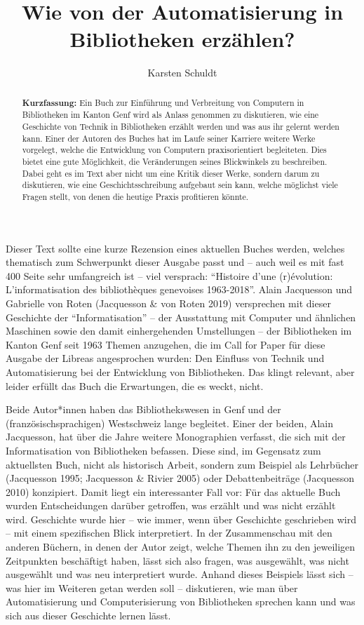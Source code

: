 \documentclass[a4paper,
fontsize=11pt,
oneside,
numbers=noperiodatend,
parskip=half-,
bibliography=totoc,
final
]{scrartcl}
\title{\LARGE{Wie von der Automatisierung in Bibliotheken erzählen?}}%
\author{Karsten Schuldt} %
\date{}
\begin{document}
\maketitle
\thispagestyle{fancyplain} 

\begin{abstract}
\noindent
\textbf{Kurzfassung:} Ein Buch zur Einführung und Verbreitung von Computern in Bibliotheken im Kanton Genf wird als Anlass genommen zu diskutieren, wie eine Geschichte von Technik in Bibliotheken erzählt werden und was aus ihr gelernt werden kann. Einer der Autoren des Buches hat im Laufe seiner Karriere weitere Werke vorgelegt, welche die Entwicklung von Computern praxisorientiert begleiteten. Dies bietet eine gute Möglichkeit, die Veränderungen seines Blickwinkels zu beschreiben. Dabei geht es im Text aber nicht um eine Kritik dieser Werke, sondern darum zu diskutieren, wie eine Geschichtsschreibung aufgebaut sein kann, welche möglichst viele Fragen stellt, von denen die heutige Praxis profitieren könnte.
\end{abstract}


Dieser Text sollte eine kurze Rezension eines aktuellen Buches werden,
welches thematisch zum Schwerpunkt dieser Ausgabe passt und -- auch weil
es mit fast 400 Seite sehr umfangreich ist -- viel versprach:
\enquote{Histoire d'une (r)évolution: L'informatisation des
bibliothèques genevoises 1963-2018}. Alain Jacquesson und Gabrielle von
Roten (Jacquesson \& von Roten 2019) versprechen mit dieser Geschichte
der \enquote{Informatisation} -- der Ausstattung mit Computer und
ähnlichen Maschinen sowie den damit einhergehenden Umstellungen -- der
Bibliotheken im Kanton Genf seit 1963 Themen anzugehen, die im Call for
Paper für diese Ausgabe der Libreas angesprochen wurden: Den Einfluss
von Technik und Automatisierung bei der Entwicklung von Bibliotheken.
Das klingt relevant, aber leider erfüllt das Buch die Erwartungen, die
es weckt, nicht.

Beide Autor*innen haben das Bibliothekswesen in Genf und der
(französischsprachigen) Westschweiz lange begleitet. Einer der beiden,
Alain Jacquesson, hat über die Jahre weitere Monographien verfasst, die
sich mit der Informatisation von Bibliotheken befassen. Diese sind, im
Gegensatz zum aktuellsten Buch, nicht als historisch Arbeit, sondern zum Beispiel
als Lehrbücher (Jacquesson 1995; Jacquesson \& Rivier 2005) oder
Debattenbeiträge (Jacquesson 2010) konzipiert. Damit liegt ein
interessanter Fall vor: Für das aktuelle Buch wurden Entscheidungen
darüber getroffen, was erzählt und was nicht erzählt wird. Geschichte
wurde hier -- wie immer, wenn über Geschichte geschrieben wird -- mit
einem spezifischen Blick interpretiert. In der Zusammenschau mit den
anderen Büchern, in denen der Autor zeigt, welche Themen ihn zu den
jeweiligen Zeitpunkten beschäftigt haben, lässt sich also fragen, was
ausgewählt, was nicht ausgewählt und was neu interpretiert wurde. Anhand
dieses Beispiels lässt sich -- was hier im Weiteren getan werden soll --
diskutieren, wie man über Automatisierung und Computerisierung von
Bibliotheken sprechen kann und was sich aus dieser Geschichte lernen
lässt.
\end{document}
